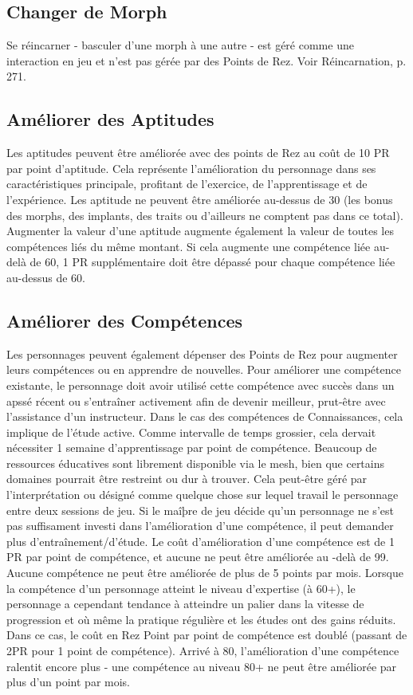 \subsection{Changer de Morph} \label{sec:switching-morphs} 

Se réincarner - basculer d'une morph à une autre - est géré comme une interaction en jeu et n'est pas gérée par des Points de Rez. Voir Réincarnation, p. 271. 

\subsection{Améliorer des Aptitudes} \label{sec:improving-aptitudes} 

Les aptitudes peuvent être améliorée avec des points de Rez au coût de 10 PR par point d'aptitude. Cela représente l'amélioration du personnage dans ses caractéristiques principale, profitant de l'exercice, de l'apprentissage et de l'expérience. Les aptitude ne peuvent être améliorée au-dessus de 30 (les bonus des morphs, des implants, des traits ou d'ailleurs ne comptent pas dans ce total). Augmenter la valeur d'une aptitude augmente également la valeur de toutes les compétences liés du même montant. Si cela augmente une compétence liée au-delà de 60, 1 PR supplémentaire doit être dépassé pour chaque compétence liée au-dessus de 60. 

\subsection{Améliorer des Compétences} \label{sec:improving-skills} 

Les personnages peuvent également dépenser des Points de Rez pour augmenter leurs compétences ou en apprendre de nouvelles. Pour améliorer une compétence existante, le personnage doit avoir utilisé cette compétence avec succès dans un apssé récent ou s'entraîner activement afin de devenir meilleur, prut-être avec l'assistance d'un instructeur. Dans le cas des compétences de Connaissances, cela implique de l'étude active. Comme intervalle de temps grossier, cela dervait nécessiter 1 semaine d'apprentissage par point de compétence. Beaucoup de ressources éducatives sont librement disponible via le mesh, bien que certains domaines pourrait être restreint ou dur à trouver. Cela peut-être géré par l'interprétation ou désigné comme quelque chose sur lequel travail le personnage entre deux sessions de jeu. Si le maîþre de jeu décide qu'un personnage ne s'est pas suffisament investi dans l'amélioration d'une compétence, il peut demander plus d'entraînement/d'étude. Le coût d'amélioration d'une compétence est de 1 PR par point de compétence, et aucune ne peut être améliorée au -delà de 99. Aucune compétence ne peut être améliorée de plus de 5 points par mois. Lorsque la compétence d'un personnage atteint le niveau d'expertise (à 60+), le personnage a cependant tendance à atteindre un palier dans la vitesse de progression et où même la pratique régulière et les études ont des gains réduits. Dans ce cas, le coût en Rez Point par point de compétence est doublé (passant de 2PR pour 1 point de compétence). Arrivé à 80, l'amélioration d'une compétence ralentit encore plus - une compétence au niveau 80+ ne peut être améliorée par plus d'un point par mois. 

